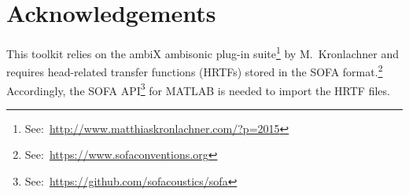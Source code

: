 \documentclass[11pt, oneside]{article}
\begin{document}

\section*{Acknowledgements}
This toolkit relies on the ambiX ambisonic plug-in suite\footnote{See:~\url{http://www.matthiaskronlachner.com/?p=2015}}
by M.~Kronlachner and requires head-related transfer functions (HRTFs) stored in the SOFA format.\footnote{See:~\url{https://www.sofaconventions.org}}
Accordingly, the SOFA API\footnote{See:~\url{https://github.com/sofacoustics/sofa}} for MATLAB is needed to import the HRTF files.



\end{document}
